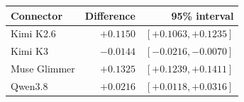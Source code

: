 \begin{tabular}{lrr}
\toprule
Connector & Difference & 95\% interval\\
\midrule
Kimi K2.6 & $+0.1150$ & $[+0.1063, +0.1235]$\\
Kimi K3 & $-0.0144$ & $[-0.0216, -0.0070]$\\
Muse Glimmer & $+0.1325$ & $[+0.1239, +0.1411]$\\
Qwen3.8 & $+0.0216$ & $[+0.0118, +0.0316]$\\
\bottomrule
\end{tabular}
